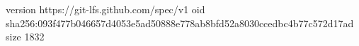version https://git-lfs.github.com/spec/v1
oid sha256:093f477b046657d4053e5ad50888e778ab8bfd52a8030ccedbc4b77c572d17ad
size 1832
